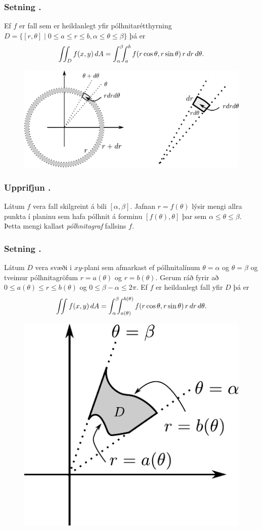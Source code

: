 \subsubsection{Setning \kaflanr.}
Ef $f$ er fall sem er heildanlegt yfir 
pólhnitarétthyrning
$D=\{[r,\theta]\mid 0\leq a\leq r\leq b, \alpha\leq \theta\leq\beta\}$
þá er 
$$\int\!\!\!\int_D f(x,y)\,dA=\int_\alpha^\beta\!\!\!\int_{a}^{b}
f(r\cos\theta,r\sin\theta)\,r\,dr\, d\theta.$$

\begin {figure}[h!]
 \centering
            \includegraphics[width=0.85\linewidth]{polarelement}
\end {figure}

\subsubsection{Upprifjun \kaflanr.}
Látum $f$ vera fall skilgreint á bili 
$[\alpha,\beta]$.  Jafnan $r=f(\theta)$ lýsir mengi allra punkta í
planinu sem hafa pólhnit á forminu $[f(\theta),\theta]$ þar sem
$\alpha\leq\theta\leq\beta$.  Þetta mengi kallast {\em pólhnitagraf}
fallsins $f$. 


\subsubsection{Setning \kaflanr.}
Látum $D$ vera svæði i $xy$-plani sem
afmarkast ef pólhnitalínum $\theta=\alpha$ og $\theta=\beta$ og
tveimur pólhnitagröfum $r=a(\theta)$ og $r=b(\theta)$.  Gerum ráð
fyrir að $0\leq a(\theta)\leq
r\leq b(\theta)$ og $0\leq \beta-\alpha\leq 2\pi$.
Ef $f$ er heildanlegt fall yfir $D$
þá er 
$$\int\!\!\!\int f(x,y)\,dA=\int_\alpha^\beta\!\!\!\int_{a(\theta)}^{b(\theta)}
f(r\cos\theta,r\sin\theta)\,r\,dr\, d\theta.$$


\begin {figure}[h!]
 \centering
            \includegraphics[width=0.35\linewidth]{polarsvaedi}
\end {figure}



